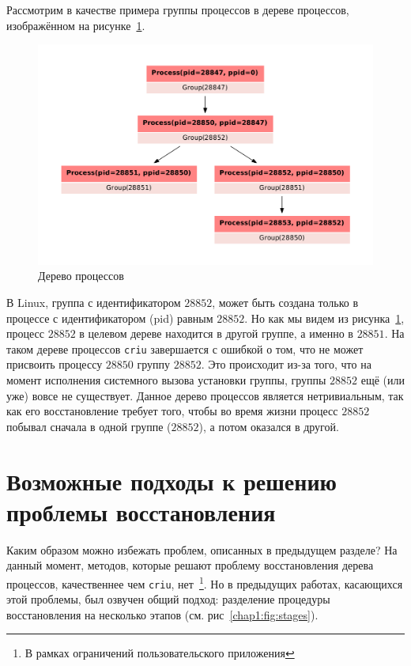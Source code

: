 \begin{exmp}
\label{chap1:exmp:criugroups}
Рассмотрим в качестве примера группы процессов в дереве процессов, изображённом на рисунке~\ref{chap1:fig:groupstree}.

\begin{figure}[ht!]
	\centering
	\includegraphics[scale=0.5]{fig/groups-pstree.pdf}
\caption{Дерево процессов}
\label{chap1:fig:groupstree}
\end{figure}

В Linux, группа с идентификатором $28852$, может быть создана только в процессе с идентификатором (pid) равным $28852$.
Но как мы видем из рисунка~\ref{chap1:fig:groupstree}, процесс $28852$ в целевом дереве находится в другой группе, а именно в $28851$. На таком дереве процессов \texttt{criu} завершается с ошибкой о том, что не может присвоить процессу $28850$ группу $28852$. Это происходит из-за того, что на момент исполнения системного вызова установки группы, группы $28852$ ещё (или уже) вовсе не существует. Данное дерево процессов является нетривиальным, так как его восстановление требует того, чтобы во время жизни процесс $28852$ побывал сначала в одной группе ($28852$), а потом оказался в другой.
\end{exmp}

\section{Возможные подходы к решению проблемы восстановления}
\label{chap1:sec:approaches}

Каким образом можно избежать проблем, описанных в предыдущем разделе? На данный момент, методов, которые решают проблему восстановления дерева процессов, качественнее чем \texttt{criu}, нет~\footnote{В рамках ограничений пользовательского приложения}. Но в предыдущих работах, касающихся этой проблемы, был озвучен общий подход: разделение процедуры восстановления на несколько этапов (см. рис~\ref{chap1:fig:stages}).

